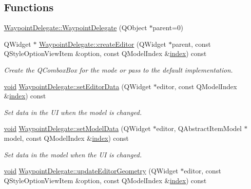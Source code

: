 \subsection*{Functions}
\begin{DoxyCompactItemize}
\item 
\hyperlink{group___path_planner_ga91775a49b804a156874199ff12e57110}{Waypoint\-Delegate\-::\-Waypoint\-Delegate} (Q\-Object $\ast$parent=0)
\item 
Q\-Widget $\ast$ \hyperlink{group___path_planner_ga8244740cc7a6bf781698edeebe341d8f}{Waypoint\-Delegate\-::create\-Editor} (Q\-Widget $\ast$parent, const Q\-Style\-Option\-View\-Item \&option, const Q\-Model\-Index \&\hyperlink{glext_8h_ab47dd9958bcadea08866b42bf358e95e}{index}) const 
\begin{DoxyCompactList}\small\item\em Create the Q\-Combox\-Box for the mode or pass to the default implementation. \end{DoxyCompactList}\item 
\hyperlink{group___u_a_v_objects_plugin_ga444cf2ff3f0ecbe028adce838d373f5c}{void} \hyperlink{group___path_planner_gaea8e4c0fe854e7d0ed69544eef67180a}{Waypoint\-Delegate\-::set\-Editor\-Data} (Q\-Widget $\ast$editor, const Q\-Model\-Index \&\hyperlink{glext_8h_ab47dd9958bcadea08866b42bf358e95e}{index}) const 
\begin{DoxyCompactList}\small\item\em Set data in the U\-I when the model is changed. \end{DoxyCompactList}\item 
\hyperlink{group___u_a_v_objects_plugin_ga444cf2ff3f0ecbe028adce838d373f5c}{void} \hyperlink{group___path_planner_gaf22bb7834577da6e336e7a52a563a89a}{Waypoint\-Delegate\-::set\-Model\-Data} (Q\-Widget $\ast$editor, Q\-Abstract\-Item\-Model $\ast$model, const Q\-Model\-Index \&\hyperlink{glext_8h_ab47dd9958bcadea08866b42bf358e95e}{index}) const 
\begin{DoxyCompactList}\small\item\em Set data in the model when the U\-I is changed. \end{DoxyCompactList}\item 
\hyperlink{group___u_a_v_objects_plugin_ga444cf2ff3f0ecbe028adce838d373f5c}{void} \hyperlink{group___path_planner_ga19057f741d6491a3911c76e747a3479f}{Waypoint\-Delegate\-::update\-Editor\-Geometry} (Q\-Widget $\ast$editor, const Q\-Style\-Option\-View\-Item \&option, const Q\-Model\-Index \&\hyperlink{glext_8h_ab47dd9958bcadea08866b42bf358e95e}{index}) const 

\end{DoxyCompactItemize}
